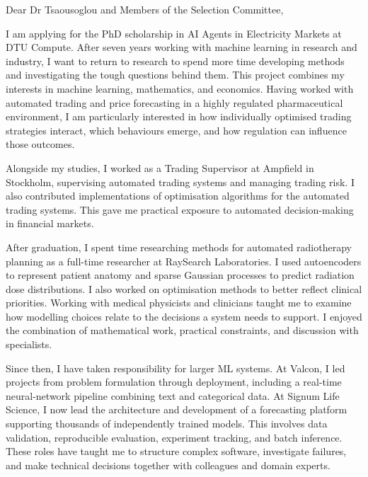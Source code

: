 \documentclass[11pt,a4paper]{moderncv}
\begin{document}
\makecvtitle
Dear Dr Tsaousoglou and Members of the Selection Committee,

\vspace*{2em}
I am applying for the PhD scholarship in AI Agents in Electricity Markets at DTU Compute. After seven years working with machine learning in research and industry, I want to return to research to spend more time developing methods and investigating the tough questions behind them. This project combines my interests in machine learning, mathematics, and economics. Having worked with automated trading and price forecasting in a highly regulated pharmaceutical environment, I am particularly interested in how individually optimised trading strategies interact, which behaviours emerge, and how regulation can influence those outcomes.

\vspace{4pt}
\hspace*{2em}
Alongside my studies, I worked as a Trading Supervisor at Ampfield in Stockholm, supervising automated trading systems and managing trading risk. I also contributed implementations of optimisation algorithms for the automated trading systems. This gave me practical exposure to automated decision-making in financial markets.

\vspace{4pt}
\hspace*{2em}
After graduation, I spent time researching methods for automated radiotherapy planning as a full-time researcher at RaySearch Laboratories. I used autoencoders to represent patient anatomy and sparse Gaussian processes to predict radiation dose distributions. I also worked on optimisation methods to better reflect clinical priorities. Working with medical physicists and clinicians taught me to examine how modelling choices relate to the decisions a system needs to support. I enjoyed the combination of mathematical work, practical constraints, and discussion with specialists.

\vspace{4pt}
\hspace*{2em}
Since then, I have taken responsibility for larger ML systems. At Valcon, I led projects from problem formulation through deployment, including a real-time neural-network pipeline combining text and categorical data. At Signum Life Science, I now lead the architecture and development of a forecasting platform supporting thousands of independently trained models. This involves data validation, reproducible evaluation, experiment tracking, and batch inference. These roles have taught me to structure complex software, investigate failures, and make technical decisions together with colleagues and domain experts.
\end{document}
